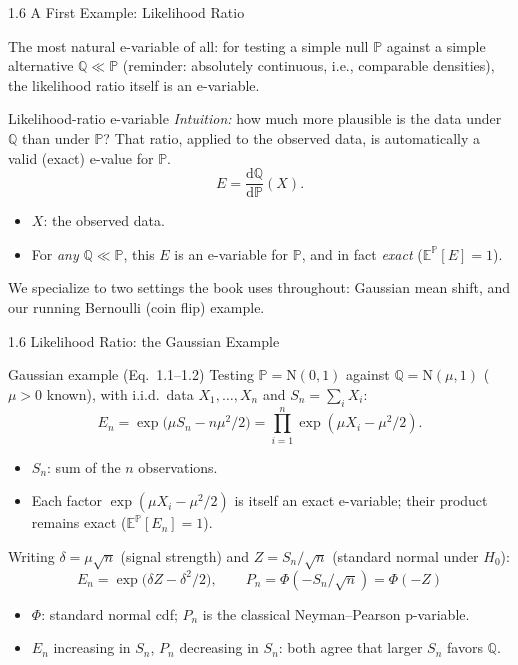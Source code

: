 \documentclass[aspectratio=169,10pt]{beamer}
\begin{document}
\begin{frame}{1.6 A First Example: Likelihood Ratio}

The most natural e-variable of all: for testing a simple null $\mathbb{P}$
against a simple alternative $\mathbb{Q}\ll\mathbb{P}$ (reminder:
absolutely continuous, i.e., comparable densities), the likelihood ratio
itself is an e-variable.

\begin{block}{Likelihood-ratio e-variable}
\emph{Intuition:} how much more plausible is the data under $\mathbb{Q}$
than under $\mathbb{P}$? That ratio, applied to the observed data, is
automatically a valid (exact) e-value for $\mathbb{P}$.
\[
  E = \frac{\mathrm{d}\mathbb{Q}}{\mathrm{d}\mathbb{P}}(X).
\]
\begin{itemize}
  \item $X$: the observed data.
  \item For \emph{any} $\mathbb{Q}\ll\mathbb{P}$, this $E$ is an e-variable
    for $\mathbb{P}$, and in fact \emph{exact}
    ($\mathbb{E}^{\mathbb{P}}[E]=1$).
\end{itemize}
\end{block}

We specialize to two settings the book uses throughout: Gaussian mean
shift, and our running Bernoulli (coin flip) example.

\end{frame}

\begin{frame}{1.6 Likelihood Ratio: the Gaussian Example}
\small
\begin{block}{Gaussian example (Eq.\ 1.1--1.2)}
Testing $\mathbb{P}=\mathrm{N}(0,1)$ against $\mathbb{Q}=\mathrm{N}(\mu,1)$
($\mu>0$ known), with i.i.d.\ data $X_1,\dots,X_n$ and $S_n=\sum_i X_i$:
\[
  E_n = \exp\!\big(\mu S_n - n\mu^2/2\big) = \prod_{i=1}^n \exp(\mu X_i - \mu^2/2).
\]
\begin{itemize}
  \item $S_n$: sum of the $n$ observations.
  \item Each factor $\exp(\mu X_i-\mu^2/2)$ is itself an exact e-variable;
    their product remains exact ($\mathbb{E}^{\mathbb{P}}[E_n]=1$).
\end{itemize}
Writing $\delta=\mu\sqrt{n}$ (signal strength) and $Z=S_n/\sqrt{n}$
(standard normal under $H_0$):
\[
  E_n = \exp\!\big(\delta Z - \delta^2/2\big),
  \qquad
  P_n = \Phi(-S_n/\sqrt n) = \Phi(-Z)
\]
\begin{itemize}
  \item $\Phi$: standard normal cdf; $P_n$ is the classical Neyman--Pearson
    p-variable.
  \item $E_n$ increasing in $S_n$, $P_n$ decreasing in $S_n$: both agree
    that larger $S_n$ favors $\mathbb{Q}$.
\end{itemize}
\end{block}

\end{frame}
\end{document}
